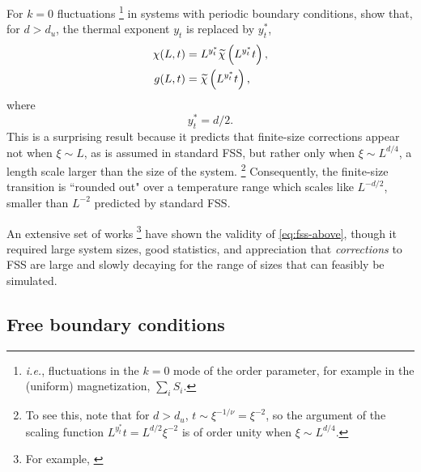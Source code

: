 For $k=0$ fluctuations%
\footnote{%
  \emph{i.e.}, fluctuations in the $k=0$ mode of the order parameter, for
  example in the (uniform) magnetization, $\sum_i S_i$.
}
in systems with periodic boundary conditions, \textcite{binder1985finite} show
that, for $d>d_u$, the thermal exponent $y_t$ is replaced by $y_t^*$,
\begin{subequations}
\begin{align}
  \chi(L,t) &= L^{y_t^*} \widetilde{\chi}\left(L^{y_t^*} t\right),
  \label{eq:fss-above-susc} \\
  g(L,t) &= \widetilde{\chi}\left(L^{y_t^*} t\right),
  \label{eq:fss-above-binder}
\end{align}
\label{eq:fss-above}
\end{subequations}
where
\begin{equation}
  y_t^*=d/2.
  \label{eq:fss-above-yt}
\end{equation}
This is a surprising result because it predicts that finite-size corrections
appear not when $\xi \sim L$, as is assumed in standard FSS, but rather only
when $\xi \sim L^{d/4}$, a length scale larger than the size of the system.%
\footnote{
  To see this, note that for $d > d_u$, $t \sim \xi^{-1/\nu} = \xi^{-2}$, so
  the argument of the scaling function $L^{y_t^*} t = L^{d/2} \xi^{-2}$ is of
  order unity when $\xi \sim L^{d/4}$.
}
Consequently, the finite-size transition is ``rounded out" over a temperature
range which scales like $L^{-d/2}$, smaller than $L^{-2}$ predicted by standard
FSS.

An extensive set of works%
\footnote{%
  For example,
  \textcite{
    luijten1996finite,
    parisi1996scaling,
    blote1997universality,
    luijten1999finite,
    binder2001monte,
  }
}
have shown the validity of \cref{eq:fss-above}, though it required large system
sizes, good statistics, and appreciation that \emph{corrections} to FSS are
large and slowly decaying for the range of sizes that can feasibly be
simulated.


\subsection{Free boundary conditions}

